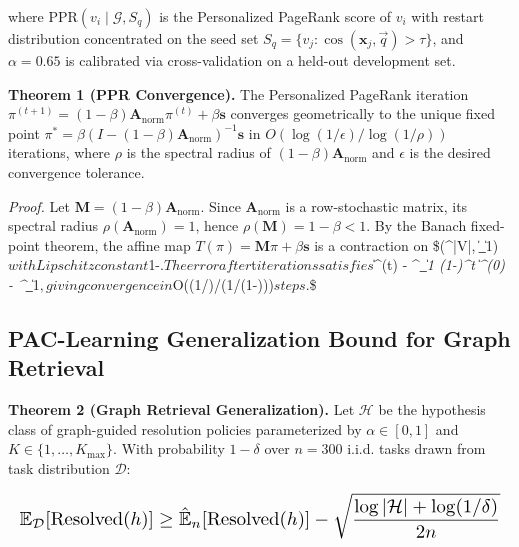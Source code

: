 \documentclass[10pt,twocolumn,letterpaper]{article}
\begin{document}
where $\text{PPR}(v_i \mid \mathcal{G}, S_q)$ is the Personalized PageRank score of $v_i$ with restart distribution concentrated on the seed set $S_q = \{v_j : \cos(\mathbf{x}_j, \vec{q}) > \tau\}$, and $\alpha = 0.65$ is calibrated via cross-validation on a held-out development set.

\textbf{Theorem 1 (PPR Convergence).} The Personalized PageRank iteration $\pi^{(t+1)} = (1-\beta) \mathbf{A}_{\text{norm}} \pi^{(t)} + \beta \mathbf{s}$ converges geometrically to the unique fixed point $\pi^* = \beta(I - (1-\beta)\mathbf{A}_{\text{norm}})^{-1}\mathbf{s}$ in $O(\log(1/\epsilon) / \log(1/\rho))$ iterations, where $\rho$ is the spectral radius of $(1-\beta)\mathbf{A}_{\text{norm}}$ and $\epsilon$ is the desired convergence tolerance.

\textit{Proof.} Let $\mathbf{M} = (1-\beta)\mathbf{A}_{\text{norm}}$. Since $\mathbf{A}_{\text{norm}}$ is a row-stochastic matrix, its spectral radius $\rho(\mathbf{A}_{\text{norm}}) = 1$, hence $\rho(\mathbf{M}) = 1-\beta < 1$. By the Banach fixed-point theorem, the affine map $T(\pi) = \mathbf{M}\pi + \beta\mathbf{s}$ is a contraction on \$(^{|V|}, \|\cdot\|\_1)$ with Lipschitz constant $1-\beta$. The error after $t$ iterations satisfies $\|\pi^{(t)} - \pi^\textit{\|\_1 \leq (1-\beta)^t \|\pi^{(0)} - \pi^}\|\_1$, giving convergence in $O(\log(1/\epsilon)/\log(1/(1-\beta)))$ steps. $\square\$


\subsection{PAC-Learning Generalization Bound for Graph Retrieval}


\textbf{Theorem 2 (Graph Retrieval Generalization).} Let $\mathcal{H}$ be the hypothesis class of graph-guided resolution policies parameterized by $\alpha \in [0,1]$ and $K \in \{1,\ldots,K_{\max}\}$. With probability $1-\delta$ over $n = 300$ i.i.d. tasks drawn from task distribution $\mathcal{D}$:





















\begin{equation}
\resizebox{\columnwidth}{!}{$\displaystyle
\begin{aligned}
\mathbb{E}_{\mathcal{D}}[\text{Resolved}(h)] \geq \hat{\mathbb{E}}_n[\text{Resolved}(h)] - \sqrt{\frac{\log|\mathcal{H}| + \log(1/\delta)}{2n}}
\end{aligned}
$}
\end{equation}
\end{document}
